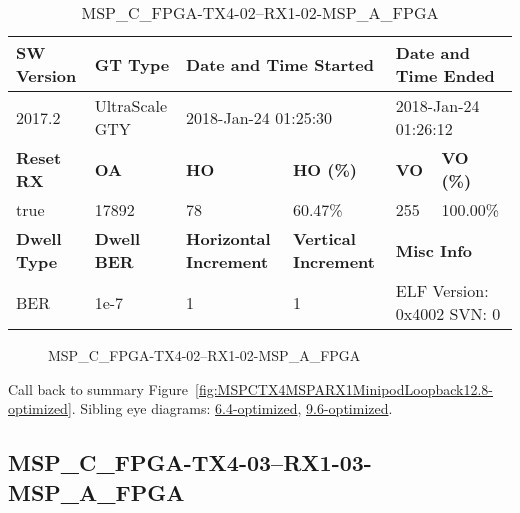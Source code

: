 \begin{table}[h]
\centering
\caption{MSP\_C\_FPGA-TX4-02--RX1-02-MSP\_A\_FPGA}
\label{tab:MSPCFPGATX402RX102MSPAFPGA12.8-optimized}
\begin{tabular}{@{}|l|l|l|l|l|l|@{}}
\toprule
\textbf{SW Version}                & \textbf{GT Type}   & \multicolumn{2}{l|}{\textbf{Date and Time Started}}            & \multicolumn{2}{l|}{\textbf{Date and Time Ended}}        \\ \midrule
2017.2                       & UltraScale GTY          & \multicolumn{2}{l|}{2018-Jan-24 01:25:30}                   & \multicolumn{2}{l|}{2018-Jan-24 01:26:12}               \\ \midrule
\textbf{Reset RX}                  & \textbf{OA} & \textbf{HO}   & \textbf{HO (\%)} & \textbf{VO} & \textbf{VO (\%)} \\ \midrule
true & 17892        & 78          & 60.47\%        & 255        & 100.00\%       \\ \midrule
\textbf{Dwell Type}                & \textbf{Dwell BER} & \textbf{Horizontal Increment} & \textbf{Vertical Increment}    & \multicolumn{2}{l|}{\textbf{Misc Info}}                  \\ \midrule
BER                            & 1e-7        & 1        & 1           & \multicolumn{2}{l|}{ELF Version: 0x4002 SVN: 0}                         \\ \bottomrule
\end{tabular}
\end{table}

\begin{figure}[h]
\caption{MSP\_C\_FPGA-TX4-02--RX1-02-MSP\_A\_FPGA} \label{fig:MSPCFPGATX402RX102MSPAFPGA12.8-optimized}
\end{figure}

Call back to summary Figure~\ref{fig:MSPCTX4MSPARX1MinipodLoopback12.8-optimized}.
Sibling eye diagrams: \hyperref[sec:MSPCFPGATX402RX102MSPAFPGA6.4-optimized]{6.4-optimized}, \hyperref[sec:MSPCFPGATX402RX102MSPAFPGA9.6-optimized]{9.6-optimized}.

\clearpage
\newpage


\subsection{MSP\_C\_FPGA-TX4-03--RX1-03-MSP\_A\_FPGA}\label{sec:MSPCFPGATX403RX103MSPAFPGA12.8-optimized}

